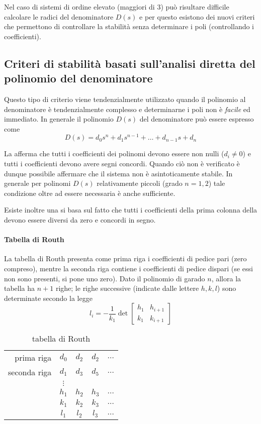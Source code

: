 		Nel caso di sistemi di ordine elevato (maggiori di 3) può risultare difficile calcolare le radici del denominatore $D(s)$ e per questo esistono dei nuovi criteri che permettono di controllare la stabilità senza determinare i poli (controllando i coefficienti).
		
	\subsection{Criteri di stabilità basati sull'analisi diretta del polinomio del denominatore}
		Questo tipo di criterio viene tendenzialmente utilizzato quando il polinomio al denominatore è tendenzialmente complesso e determinarne i poli non è \textit{facile} ed immediato. In generale il polinomio $D(s)$ del denominatore può essere espresso come
		\[ D(s) = d_0 s^n + d_1 s^{n-1} + \dots + d_{n-1} s + d_n \]
		
		La  afferma che tutti i coefficienti dei polinomi devono essere non nulli ($d_i\neq 0$) e tutti i coefficienti devono avere segni concordi. Quando ciò non è verificato è dunque possibile affermare che il sistema non è asintoticamente stabile. In generale per polinomi $D(s)$ relativamente piccoli (grado $n=1,2$) tale condizione oltre ad essere necessaria è anche sufficiente.
		
		Esiste inoltre una  si basa sul fatto che tutti i coefficienti della prima colonna della  devono essere diversi da zero e concordi in segno.
		
		\paragraph{Tabella di Routh} La tabella di Routh presenta come prima riga i coefficienti di pedice pari (zero compreso), mentre la seconda riga contiene i coefficienti di pedice dispari (se essi non sono presenti, si pone uno zero). Dato il polinomio di garado $n$, allora la tabella ha $n+1$ righe; le righe successive (indicate dalle lettere $h,k,l$) sono determinate  secondo la legge
		\[ l_i = -\frac 1 {k_1} \det \begin{bmatrix}
			h_1 & h_{i+1} \\
			k_1 & k_{i+1}
		\end{bmatrix} \] 
		\begin{SCtable}[0.5][bth]
			\begin{tabular}{ r | c  c c c }
				prima riga & $d_0$ &  $d_2$ & $d_2$ & $\dots$ \\
				seconda riga & $d_1$ &  $d_3$ & $d_5$ & $\dots$ \\
				& $\vdots$ \\
				& $h_1$ & $h_2$ & $h_3$ & $\dots$\\
				& $k_1$ & $k_2$ & $k_3$ & $\dots$\\
				& $l_1$ & $l_2$ & $l_3$ & $\dots$\\
			\end{tabular}
			\caption{tabella di Routh}
		\end{SCtable}
	
